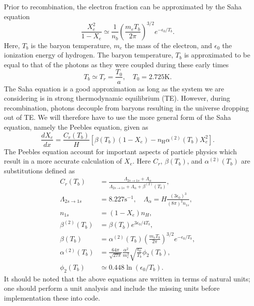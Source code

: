 \documentclass[a4paper, 10pt, reqno]{amsart}
\begin{document}
Prior to recombination, the electron fraction can be approximated by the Saha
equation
\begin{equation}\label{eq: saha}
    \frac{X_{e}^{2}}{1-X_{e}} \simeq \frac{1}{n_{b}}\left(\frac{m_{e} T_{b}}{2
    \pi}\right)^{3 / 2} e^{-\epsilon_{0} / T_{b}}.
\end{equation}
Here, $T_b$ is the baryon temperature, $m_e$ the mass of the electron, and
$\epsilon_0$ the ionization energy of hydrogen. The baryon temperature, $T_b$
is approximated to be equal to that of the photons as they were coupled during
these early times
\begin{equation}\label{eq: T_b}
    T_{b} \simeq T_{r}=\frac{T_{0}}{a}, \quad T_{0}=2.725 \mathrm{K}.
\end{equation}
The Saha equation is a good approximation as long as the system we are
considering is in strong thermodynamic equilibrium (TE). However, during
recombination, photons decouple from baryons resulting in the universe
dropping out of TE. We will therefore have to use the more general form of the
Saha equation, namely the Peebles equation, given as
\begin{equation}\label{eq: peeble}
    \frac{d X_{e}}{d
    x}=\frac{C_{r}\left(T_{b}\right)}{H}\left[\beta\left(T_{b}\right)\left(1-
    X_{e}\right)-n_{\mathrm{H}} \alpha^{(2)}\left(T_{b}\right)
    X_{e}^{2}\right].
\end{equation}
The Peebles equation account for important aspects of particle physics which
result in a more accurate calculation of $X_e$. Here $C_r$, $\beta(T_b)$, and
$\alpha^{(2)}(T_b)$ are substitutions defined as
\begin{align}\label{eq: subs}
    C_{r}\left(T_{b}\right)&=\frac{\Lambda_{2 s \rightarrow 1
    s}+\Lambda_{\alpha}}{\Lambda_{2 s \rightarrow 1
    s}+\Lambda_{\alpha}+\beta^{(2)}\left(T_{b}\right)}, \\
    \Lambda_{2 s \rightarrow 1 s}&=8.227 \mathrm{s}^{-1}, \quad
    \Lambda_{\alpha}=H \frac{\left(3 \epsilon_{0}\right)^{3}}{(8 \pi)^{2} n_{1
    s}},\\
    n_{1 s} &=\left(1-X_{e}\right) n_{H}, \\ \beta^{(2)}\left(T_{b}\right)
    &=\beta\left(T_{b}\right) e^{3 \epsilon_{0} / 4 T_{b}},\\
    \beta\left(T_{b}\right)&=\alpha^{(2)}\left(T_{b}\right)\left(\frac{m_{e}
    T_{b}}{2 \pi}\right)^{3 / 2} e^{-\epsilon_{0} / T_{b}},\\
    \alpha^{(2)}\left(T_{b}\right)&=\frac{64 \pi}{\sqrt{27 \pi}}
    \frac{\alpha^{2}}{m_{e}^{2}} \sqrt{\frac{\epsilon_{0}}{T_{b}}}
    \phi_{2}\left(T_{b}\right),\\
    \phi_{2}\left(T_{b}\right) &\simeq 0.448 \ln \left(\epsilon_{0} /
    T_{b}\right).
\end{align}
It should be noted that the above equations are written in terms of natural
units; one should perform a unit analysis and include the missing units before
implementation these into code.
\end{document}
